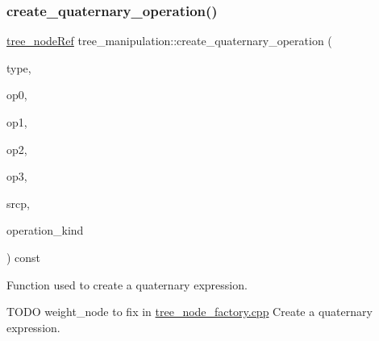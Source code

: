 \subsubsection{\texorpdfstring{create\+\_\+quaternary\+\_\+operation()}{create\_quaternary\_operation()}}
{\footnotesize\ttfamily \hyperlink{tree__node_8hpp_a6ee377554d1c4871ad66a337eaa67fd5}{tree\+\_\+node\+Ref} tree\+\_\+manipulation\+::create\+\_\+quaternary\+\_\+operation (\begin{DoxyParamCaption}\item[{const \hyperlink{tree__node_8hpp_a6ee377554d1c4871ad66a337eaa67fd5}{tree\+\_\+node\+Ref} \&}]{type,  }\item[{const \hyperlink{tree__node_8hpp_a6ee377554d1c4871ad66a337eaa67fd5}{tree\+\_\+node\+Ref} \&}]{op0,  }\item[{const \hyperlink{tree__node_8hpp_a6ee377554d1c4871ad66a337eaa67fd5}{tree\+\_\+node\+Ref} \&}]{op1,  }\item[{const \hyperlink{tree__node_8hpp_a6ee377554d1c4871ad66a337eaa67fd5}{tree\+\_\+node\+Ref} \&}]{op2,  }\item[{const \hyperlink{tree__node_8hpp_a6ee377554d1c4871ad66a337eaa67fd5}{tree\+\_\+node\+Ref} \&}]{op3,  }\item[{const std\+::string \&}]{srcp,  }\item[{enum \hyperlink{tree__common_8hpp_a9efbd7c7191fb190b76c2fd05d6e7b45}{kind}}]{operation\+\_\+kind }\end{DoxyParamCaption}) const}



Function used to create a quaternary expression. 

T\+O\+DO weight\+\_\+node to fix in \hyperlink{tree__node__factory_8cpp}{tree\+\_\+node\+\_\+factory.\+cpp} Create a quaternary expression.


